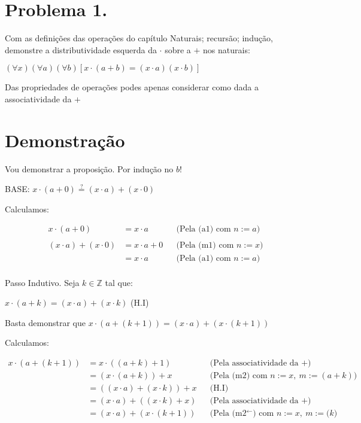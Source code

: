 \documentclass[a4paper]{article}
\author{Dawerton Eduardo Carlos Vaz }
\def\ints{{\mathbb Z}}
\def\by#1{&& \text{(#1)}\\}
\begin{document}
\section*{Problema 1.}
Com as definições das operações do capítulo  \guillemotleft Naturais; recursão; indução\guillemotright , demonstre a distributividade
esquerda da $\cdot$ sobre a $+$ nos naturais:



 \begin{center} $(\forall x)(\forall a)(\forall b)[x\cdot(a+b)=(x\cdot a)(x\cdot b)]$ \end{center}

Das propriedades de operações podes apenas considerar como dada a associatividade da $+$

\section*{Demonstração}

Vou demonstrar a proposição.\newline
Por indução no $b$!

BASE: $x\cdot(a+0)\stackrel{?}{=}(x\cdot a)+(x\cdot 0) $ 

Calculamos:


\begin{align*}
x\cdot (a+0)& = x\cdot a            \by {Pela (a1) com $n:=a$} \\
(x\cdot a)+(x\cdot0)& =x\cdot a+0   \by {Pela (m1) com $n:=x$}
& = x\cdot a                        \by {Pela (a1) com $n:=a$}
\end{align*}

Passo Indutivo. Seja $k\in \ints$ tal que:

\begin{center}$x\cdot(a+k)=(x\cdot a)+(x\cdot k)$  (H.I)\end{center}

Basta demonstrar que $x\cdot(a+(k+1))=(x\cdot a)+(x\cdot (k+1))$\newline

Calculamos:

\begin{align*}
x\cdot(a+(k+1))& = x\cdot((a+k)+1)  \by {Pela associatividade da $+$}
& =(x\cdot(a+k))+x                  \by {Pela (m2) com $n:=x, \ m:=(a+k)$}
& = ((x\cdot a)+(x\cdot k))+x       \by {H.I}
& = (x\cdot a)+((x\cdot k)+x)  \by {Pela associatividade da $+$}
& = (x\cdot a)+(x\cdot (k+1))  \by {Pela (m2$^\leftarrow$) com $n:=x, \ m:=(k$}
\end{align*}
\end{document}
